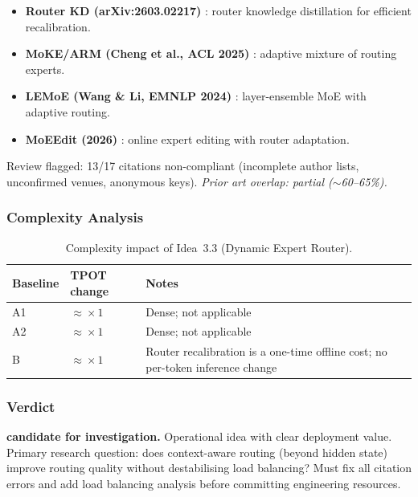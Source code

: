 \documentclass[11pt]{article}
\begin{document}
\begin{itemize}
  \item \textbf{Router KD (arXiv:2603.02217)} \cite{RouterKD2026}: router knowledge distillation for efficient recalibration.

  \item \textbf{MoKE/ARM (Cheng et al., ACL 2025)} \cite{ChengEtAl2025}: adaptive mixture of routing experts.

  \item \textbf{LEMoE (Wang \& Li, EMNLP 2024)} \cite{WangLi2024LEMoE}: layer-ensemble MoE with adaptive routing.

  \item \textbf{MoEEdit (2026)} \cite{MoEEdit2026}: online expert editing with router adaptation.
\end{itemize}

\noindent
Review flagged: 13/17 citations non-compliant (incomplete author lists, unconfirmed venues, anonymous keys).
\emph{Prior art overlap: partial ($\sim$60--65\%).}

\subsubsection*{Complexity Analysis}

\begin{table}[h]
\centering
\caption{Complexity impact of Idea~3.3 (Dynamic Expert Router).}
\label{tab:complexity-3-3}
\begin{tabular}{llp{7cm}}
\toprule
\textbf{Baseline} & \textbf{TPOT change} & \textbf{Notes} \\
\midrule
A1 & $\approx\!\times 1$ & Dense; not applicable \\
A2 & $\approx\!\times 1$ & Dense; not applicable \\
B  & $\approx\!\times 1$ & Router recalibration is a one-time offline cost; no per-token inference change \\
\bottomrule
\end{tabular}
\end{table}

\subsubsection*{Verdict}
\textbf{candidate for investigation.}
Operational idea with clear deployment value.
Primary research question: does context-aware routing (beyond hidden state) improve routing quality without destabilising load balancing?
Must fix all citation errors and add load balancing analysis before committing engineering resources.
\end{document}
